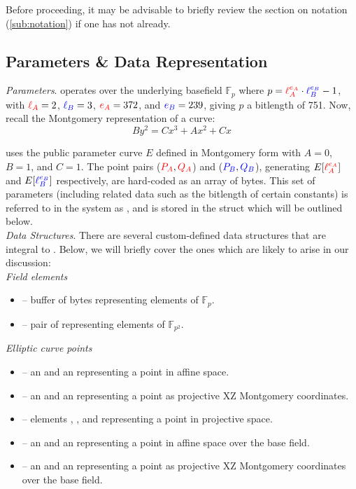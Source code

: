 Before proceeding, it may be advisable to briefly review the section on notation (\ref{sub:notation}) if one has not already.

\subsection{Parameters \& Data Representation}

\noindent
\emph{Parameters}. \sidh operates over the underlying basefield $\mathbb{F}_{p}$ where $p = \textcolor{red}{\ell_{A}^{e_A}}\cdot\textcolor{blue}{\ell_{B}^{e_B}} - 1$, with $\textcolor{red}{\ell_{A}} = 2$, $\textcolor{blue}{\ell_{B}} = 3$, $\textcolor{red}{e_A} = 372$, and $\textcolor{blue}{e_B} = 239$, giving $p$ a bitlength of 751. Now, recall the Montgomery representation of a curve:
$$
By^2 = Cx^3 + Ax^2 + Cx
$$

\sidh uses the public parameter curve $E$ defined in Montgomery form with $A = 0$, $B = 1$, and $C = 1$. The point pairs ($\textcolor{red}{P_A},\textcolor{red}{Q_A}$) and ($\textcolor{blue}{P_B}, \textcolor{blue}{Q_B}$), generating $E[\textcolor{red}{\ell_{A}^{e_A}}]$ and $E[\textcolor{blue}{\ell_{B}^{e_B}}]$ respectively, are hard-coded as an array of bytes. This set of parameters (including related data such as the bitlength of certain constants) is referred to in the system as , and is stored in the struct  which will be outlined below.\\

\noindent
\emph{Data Structures}. There are several custom-defined data structures that are integral to \sidh. Below, we will briefly cover the ones which are likely to arise in our discussion:\\

\emph{Field elements}
\begin{itemize}
	\item {} -- buffer of bytes representing elements of $\mathbb{F}_{p}$.
	\item {} -- pair of  representing elements of $\mathbb{F}_{p^2}$.
\end{itemize}

\emph{Elliptic curve points}
\begin{itemize}
	\item {} -- an   and an   representing a point in affine space.
	\item {} -- an   and an   representing a point as projective XZ Montgomery coordinates.
	\item {} --  elements , , and  representing a point in projective space.
	\item {} -- an   and an   representing a point in affine space over the base field.
	\item {} -- an   and an   representing a point as projective XZ Montgomery coordinates over the base field.
\end{itemize}

